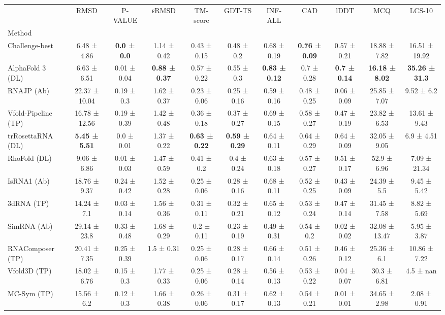 \begin{tabular}{lcccccccccc}
\toprule
 & RMSD & P-VALUE & εRMSD & TM-score & GDT-TS & INF-ALL & CAD & lDDT & MCQ & LCS-10 \\
Method &  &  &  &  &  &  &  &  &  &  \\
\midrule
Challenge-best & 6.48 ± 4.86 & \textbf{0.0 ± 0.0} & 1.14 ± 0.42 & 0.43 ± 0.15 & 0.48 ± 0.2 & 0.68 ± 0.19 & \textbf{0.76 ± 0.09} & 0.57 ± 0.21 & 18.88 ± 7.82 & 16.51 ± 19.92 \\
AlphaFold 3 (DL) & 6.63 ± 6.51 & 0.01 ± 0.04 & \textbf{0.88 ± 0.37} & 0.57 ± 0.22 & 0.55 ± 0.3 & \textbf{0.83 ± 0.12} & 0.7 ± 0.28 & \textbf{0.7 ± 0.14} & \textbf{16.18 ± 8.02} & \textbf{35.26 ± 31.3} \\
RNAJP (Ab) & 22.37 ± 10.04 & 0.19 ± 0.3 & 1.62 ± 0.37 & 0.23 ± 0.06 & 0.25 ± 0.16 & 0.59 ± 0.16 & 0.48 ± 0.25 & 0.06 ± 0.09 & 25.85 ± 7.07 & 9.52 ± 6.2 \\
Vfold-Pipeline (TP) & 16.78 ± 12.56 & 0.19 ± 0.39 & 1.42 ± 0.48 & 0.36 ± 0.18 & 0.37 ± 0.27 & 0.69 ± 0.15 & 0.58 ± 0.27 & 0.47 ± 0.19 & 23.82 ± 6.53 & 13.61 ± 9.43 \\
trRosettaRNA (DL) & \textbf{5.45 ± 5.51} & 0.0 ± 0.01 & 1.37 ± 0.22 & \textbf{0.63 ± 0.22} & \textbf{0.59 ± 0.29} & 0.64 ± 0.11 & 0.64 ± 0.29 & 0.64 ± 0.09 & 32.05 ± 9.05 & 6.9 ± 4.51 \\
RhoFold (DL) & 9.06 ± 6.86 & 0.01 ± 0.03 & 1.47 ± 0.59 & 0.41 ± 0.2 & 0.4 ± 0.24 & 0.63 ± 0.18 & 0.57 ± 0.27 & 0.51 ± 0.17 & 52.9 ± 6.96 & 7.09 ± 21.34 \\
IsRNA1 (Ab) & 18.76 ± 9.37 & 0.24 ± 0.42 & 1.52 ± 0.28 & 0.25 ± 0.06 & 0.28 ± 0.16 & 0.68 ± 0.11 & 0.52 ± 0.25 & 0.43 ± 0.09 & 24.39 ± 5.5 & 9.45 ± 5.42 \\
3dRNA (TP) & 14.24 ± 7.1 & 0.03 ± 0.14 & 1.56 ± 0.36 & 0.31 ± 0.11 & 0.32 ± 0.21 & 0.65 ± 0.12 & 0.53 ± 0.24 & 0.47 ± 0.14 & 31.45 ± 7.58 & 8.82 ± 5.69 \\
SimRNA (Ab) & 29.14 ± 23.8 & 0.33 ± 0.48 & 1.68 ± 0.29 & 0.2 ± 0.11 & 0.23 ± 0.19 & 0.49 ± 0.31 & 0.54 ± 0.2 & 0.02 ± 0.02 & 32.08 ± 13.47 & 5.95 ± 3.87 \\
RNAComposer (TP) & 20.41 ± 7.35 & 0.25 ± 0.39 & 1.5 ± 0.31 & 0.25 ± 0.06 & 0.28 ± 0.17 & 0.66 ± 0.14 & 0.51 ± 0.26 & 0.46 ± 0.12 & 25.36 ± 6.1 & 10.86 ± 7.22 \\
Vfold3D (TP) & 18.02 ± 6.76 & 0.15 ± 0.3 & 1.77 ± 0.33 & 0.25 ± 0.06 & 0.28 ± 0.14 & 0.56 ± 0.13 & 0.53 ± 0.22 & 0.04 ± 0.07 & 30.3 ± 6.81 & 4.5 ± nan \\
MC-Sym (TP) & 15.56 ± 6.2 & 0.12 ± 0.3 & 1.66 ± 0.38 & 0.26 ± 0.06 & 0.31 ± 0.17 & 0.62 ± 0.13 & 0.54 ± 0.21 & 0.01 ± 0.01 & 34.65 ± 2.98 & 2.08 ± 0.91 \\
\bottomrule
\end{tabular}
